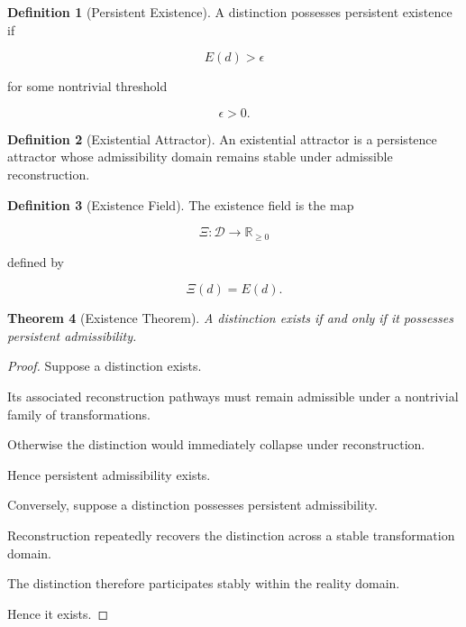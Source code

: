 \documentclass[12pt,oneside]{article}
\newtheorem{theorem}{Theorem}[section] \newtheorem{lemma}[theorem]{Lemma} \newtheorem{proposition}[theorem]{Proposition} \newtheorem{corollary}[theorem]{Corollary}
\theoremstyle{definition}
\newtheorem{definition}[theorem]{Definition} \newtheorem{axiom}[theorem]{Axiom} \newtheorem{remark}[theorem]{Remark} \newtheorem{example}[theorem]{Example}
\begin{document}
\begin{definition}[Persistent Existence]

A distinction possesses persistent existence if

\[
E(d) > \epsilon
\]

for some nontrivial threshold

\[
\epsilon > 0.
\]

\end{definition}

\begin{definition}[Existential Attractor]

An existential attractor is a persistence attractor whose admissibility domain remains stable under admissible reconstruction.

\end{definition}

\begin{definition}[Existence Field]

The existence field is the map

\[
\Xi :
\mathcal D
\rightarrow
\mathbb R_{\ge 0}
\]

defined by

\[
\Xi(d)
=
E(d).
\]

\end{definition}

\begin{theorem}[Existence Theorem]

A distinction exists if and only if it possesses persistent admissibility.

\end{theorem}

\begin{proof}

Suppose a distinction exists.

Its associated reconstruction pathways must remain admissible under a nontrivial family of transformations.

Otherwise the distinction would immediately collapse under reconstruction.

Hence persistent admissibility exists.

Conversely, suppose a distinction possesses persistent admissibility.

Reconstruction repeatedly recovers the distinction across a stable transformation domain.

The distinction therefore participates stably within the reality domain.

Hence it exists.

\end{proof}
\end{document}
